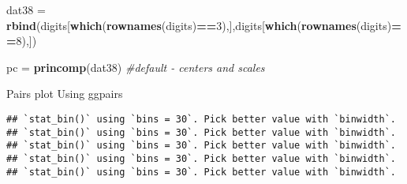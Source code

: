 \documentclass[
]{article}
\newenvironment{Shaded}{\begin{snugshade}}{\end{snugshade}}
\newcommand{\CommentTok}[1]{\textcolor[rgb]{0.56,0.35,0.01}{\textit{#1}}}
\newcommand{\DataTypeTok}[1]{\textcolor[rgb]{0.13,0.29,0.53}{#1}}
\newcommand{\DecValTok}[1]{\textcolor[rgb]{0.00,0.00,0.81}{#1}}
\newcommand{\KeywordTok}[1]{\textcolor[rgb]{0.13,0.29,0.53}{\textbf{#1}}}
\newcommand{\NormalTok}[1]{#1}
\newcommand{\OperatorTok}[1]{\textcolor[rgb]{0.81,0.36,0.00}{\textbf{#1}}}
\newcommand{\StringTok}[1]{\textcolor[rgb]{0.31,0.60,0.02}{#1}}
\begin{document}
\begin{Shaded}
\begin{Highlighting}[]
\NormalTok{dat38 =}\StringTok{ }\KeywordTok{rbind}\NormalTok{(digits[}\KeywordTok{which}\NormalTok{(}\KeywordTok{rownames}\NormalTok{(digits)}\OperatorTok{==}\DecValTok{3}\NormalTok{),],digits[}\KeywordTok{which}\NormalTok{(}\KeywordTok{rownames}\NormalTok{(digits)}\OperatorTok{==}\DecValTok{8}\NormalTok{),])}
\end{Highlighting}
\end{Shaded}

\begin{Shaded}
\begin{Highlighting}[]
\NormalTok{pc =}\StringTok{ }\KeywordTok{princomp}\NormalTok{(dat38) }\CommentTok{#default - centers and scales}
\end{Highlighting}
\end{Shaded}

Pairs plot Using ggpairs

\begin{Shaded}
\end{Shaded}

\begin{verbatim}
## `stat_bin()` using `bins = 30`. Pick better value with `binwidth`.
## `stat_bin()` using `bins = 30`. Pick better value with `binwidth`.
## `stat_bin()` using `bins = 30`. Pick better value with `binwidth`.
## `stat_bin()` using `bins = 30`. Pick better value with `binwidth`.
## `stat_bin()` using `bins = 30`. Pick better value with `binwidth`.
\end{verbatim}
\end{document}

